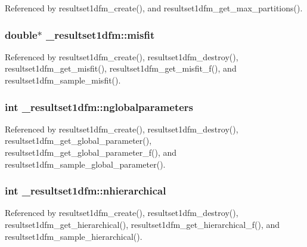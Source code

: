 Referenced by resultset1dfm\+\_\+create(), and resultset1dfm\+\_\+get\+\_\+max\+\_\+partitions().

\subsubsection[{\texorpdfstring{misfit}{misfit}}]{\setlength{\rightskip}{0pt plus 5cm}double$\ast$ \+\_\+resultset1dfm\+::misfit}\hypertarget{struct__resultset1dfm_af30e93b1c8aeefcf1af09d032f0ff61e}{}\label{struct__resultset1dfm_af30e93b1c8aeefcf1af09d032f0ff61e}


Referenced by resultset1dfm\+\_\+create(), resultset1dfm\+\_\+destroy(), resultset1dfm\+\_\+get\+\_\+misfit(), resultset1dfm\+\_\+get\+\_\+misfit\+\_\+f(), and resultset1dfm\+\_\+sample\+\_\+misfit().

\subsubsection[{\texorpdfstring{nglobalparameters}{nglobalparameters}}]{\setlength{\rightskip}{0pt plus 5cm}int \+\_\+resultset1dfm\+::nglobalparameters}\hypertarget{struct__resultset1dfm_a7383532ed70917d51d6f99036eca98b0}{}\label{struct__resultset1dfm_a7383532ed70917d51d6f99036eca98b0}


Referenced by resultset1dfm\+\_\+create(), resultset1dfm\+\_\+destroy(), resultset1dfm\+\_\+get\+\_\+global\+\_\+parameter(), resultset1dfm\+\_\+get\+\_\+global\+\_\+parameter\+\_\+f(), and resultset1dfm\+\_\+sample\+\_\+global\+\_\+parameter().

\subsubsection[{\texorpdfstring{nhierarchical}{nhierarchical}}]{\setlength{\rightskip}{0pt plus 5cm}int \+\_\+resultset1dfm\+::nhierarchical}\hypertarget{struct__resultset1dfm_a263def7ce34e2c3d9cd0a50ad0c9b067}{}\label{struct__resultset1dfm_a263def7ce34e2c3d9cd0a50ad0c9b067}


Referenced by resultset1dfm\+\_\+create(), resultset1dfm\+\_\+destroy(), resultset1dfm\+\_\+get\+\_\+hierarchical(), resultset1dfm\+\_\+get\+\_\+hierarchical\+\_\+f(), and resultset1dfm\+\_\+sample\+\_\+hierarchical().


